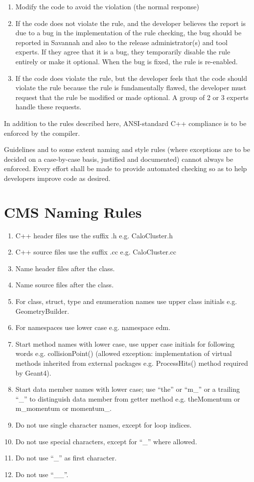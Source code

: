 \documentclass{cmspaper}
\begin{document}
\begin{enumerate}	
\item Modify the code to avoid the violation (the normal response)
\item If the code does not violate the rule, and the developer believes 
the report is due to a bug in the implementation of the rule checking, 
the bug should be reported in Savannah and also to the release 
administrator(s) and tool experts.  If they agree that it is a bug, 
they temporarily disable the rule entirely or make it optional.  
When the bug is fixed, the rule is re-enabled.
\item If the code does violate the rule, but the developer feels that 
the code should violate the rule because the rule is fundamentally flawed, 
the developer must request that the rule be modified or made optional. 
A group of 2 or 3 experts handle these requests.
\end{enumerate}

In addition to the rules described here, ANSI-standard C++ compliance is to be
enforced by the compiler. 

Guidelines and to some extent naming and style rules (where exceptions are to 
be decided on a case-by-case basis, justified and documented) cannot always 
be enforced. Every effort shall be made to provide automated checking so as to
help developers improve code as desired.


\section{CMS Naming Rules}

\begin{enumerate}

\item C++ header files use the suffix .h e.g. CaloCluster.h
\item C++ source files use the suffix .cc e.g. CaloCluster.cc
\item Name header files after the class.
\item Name source files after the class.
\item For class, struct, type and enumeration names use upper class initials 
e.g. GeometryBuilder. 
\item For namespaces use lower case e.g. namespace edm.
\item Start method names with lower case, use upper case initials for
  following words e.g. collisionPoint() (allowed exception: implementation of
  virtual methods inherited from external packages e.g. ProcessHits()
  method required by Geant4).
\item Start data member names with lower case; use ``the'' or ``m\_'' or a
  trailing ``\_'' to distinguish data member from getter method
  e.g. theMomentum or m\_momentum or momentum\_.
\item Do not use single character names, except for loop indices.
\item Do not use special characters, except for ``\_'' where allowed.
\item Do not use ``\_'' as first character.
\item Do not use ``\_\_''.
\end{enumerate}
\end{document}
